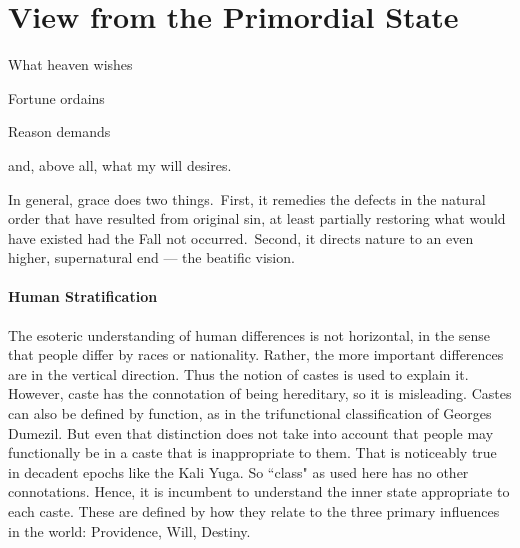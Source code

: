 \section{View from the Primordial State}

\begin{quotex}
What heaven wishes

Fortune ordains

Reason demands

and, above all, what my will desires. 

In general, grace does two things. First, it remedies the defects in the natural order that have resulted from original sin, at least partially restoring what would have existed had the Fall not occurred. Second, it directs nature to an even higher, supernatural end — the beatific vision. 

\end{quotex}
\paragraph{Human Stratification}
The esoteric understanding of human differences is not horizontal, in the sense that people differ by races or nationality. Rather, the more important differences are in the vertical direction. Thus the notion of castes is used to explain it. However, caste has the connotation of being hereditary, so it is misleading. Castes can also be defined by function, as in the trifunctional classification of Georges Dumezil. But even that distinction does not take into account that people may functionally be in a caste that is inappropriate to them. That is noticeably true in decadent epochs like the Kali Yuga. So ``class" as used here has no other connotations. Hence, it is incumbent to understand the inner state appropriate to each caste. These are defined by how they relate to the three primary influences in the world: Providence, Will, Destiny.

